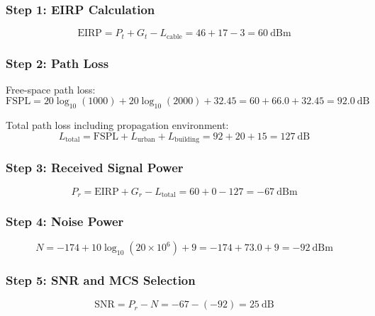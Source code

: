 \subsubsection*{Step 1: EIRP Calculation}

\begin{equation}
\text{EIRP} = P_t + G_t - L_{\text{cable}} = 46 + 17 - 3 = 60~\text{dBm}
\end{equation}

\subsubsection*{Step 2: Path Loss}

Free-space path loss:
\begin{equation}
\text{FSPL} = 20\log_{10}(1000) + 20\log_{10}(2000) + 32.45 = 60 + 66.0 + 32.45 = 92.0~\text{dB}
\end{equation}

Total path loss including propagation environment:
\begin{equation}
L_{\text{total}} = \text{FSPL} + L_{\text{urban}} + L_{\text{building}} = 92 + 20 + 15 = 127~\text{dB}
\end{equation}

\subsubsection*{Step 3: Received Signal Power}

\begin{equation}
P_r = \text{EIRP} + G_r - L_{\text{total}} = 60 + 0 - 127 = -67~\text{dBm}
\end{equation}

\subsubsection*{Step 4: Noise Power}

\begin{equation}
N = -174 + 10\log_{10}(20 \times 10^6) + 9 = -174 + 73.0 + 9 = -92~\text{dBm}
\end{equation}

\subsubsection*{Step 5: SNR and MCS Selection}

\begin{equation}
\text{SNR} = P_r - N = -67 - (-92) = 25~\text{dB}
\end{equation}

